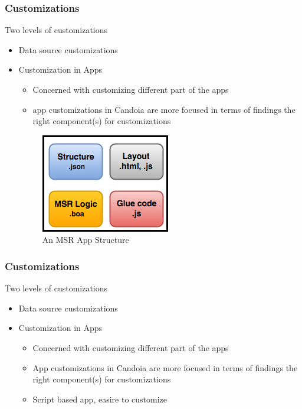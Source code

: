         \begin{frame}
        \frametitle{Customizations}
            Two levels of customizations
            \begin{itemize}
                \item Data source customizations
                \item Customization in Apps
                    \begin{itemize}
                        \item Concerned with customizing different part of the apps
                        \item app customizations in Candoia are more focused in terms of findings the right component(s) for customizations
                        \end{itemize}
            \begin{figure}
                \centering
                \includegraphics[scale=0.40]{figures/app.jpg}
                \caption{An MSR App Structure}
            \end{figure}
            \end{itemize}
        \end{frame}


        \begin{frame}
        \frametitle{Customizations}
            Two levels of customizations
            \begin{itemize}
                \item Data source customizations
                \item Customization in Apps
                    \begin{itemize}
                        \item Concerned with customizing different part of the apps
                        \item App customizations in Candoia are more focused in terms of findings the right component(s) for customizations
                        \item Script based app, easire to customize
                    \end{itemize}
            \end{itemize}
        \end{frame}



